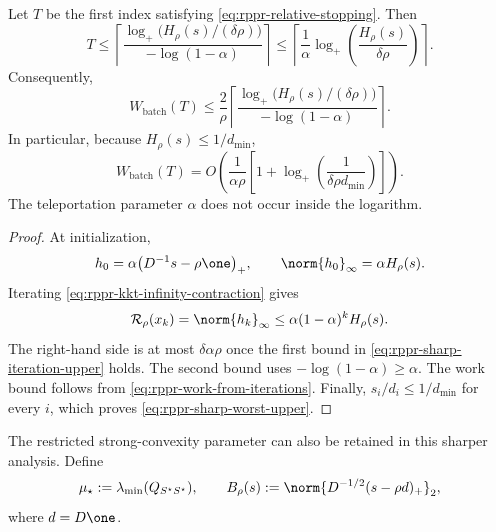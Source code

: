 \begin{theorem}
\label{thm:rppr-sharp-batch-upper}
Let \(T\) be the first index satisfying
\cref{eq:rppr-relative-stopping}.  Then
\begin{equation}
    T
    \leq
    \left\lceil
        \frac{
            \log_+\bigl(H_\rho(s)/(\delta\rho)\bigr)
        }{-\log(1-\alpha)}
    \right\rceil
    \leq
    \left\lceil
        \frac1\alpha
        \log_+\left(\frac{H_\rho(s)}{\delta\rho}\right)
    \right\rceil.
    \label{eq:rppr-sharp-iteration-upper}
\end{equation}
Consequently,
\begin{equation}
    W_{\mathrm{batch}}(T)
    \leq
    \frac{2}{\rho}
    \left\lceil
        \frac{
            \log_+\bigl(H_\rho(s)/(\delta\rho)\bigr)
        }{-\log(1-\alpha)}
    \right\rceil.
    \label{eq:rppr-sharp-work-upper}
\end{equation}
In particular, because \(H_\rho(s)\leq1/d_{\min}\),
\begin{equation}
    W_{\mathrm{batch}}(T)
    =
    O\left(
        \frac{1}{\alpha\rho}
        \left[1+\log_+\left(
            \frac{1}{\delta\rho d_{\min}}
        \right)\right]
    \right).
    \label{eq:rppr-sharp-worst-upper}
\end{equation}
The teleportation parameter \(\alpha\) does not occur inside the logarithm.
\end{theorem}

\begin{proof}
At initialization,
\begin{equation}
    h_0
    =
    \alpha\bigl(D^{-1}s-\rho\one\bigr)_+,
    \qquad
    \norm{h_0}_\infty=\alpha H_\rho(s).
    \label{eq:rppr-initial-excess}
\end{equation}
Iterating \cref{eq:rppr-kkt-infinity-contraction} gives
\[
    \mathcal{R}_\rho(x_k)
    =\norm{h_k}_\infty
    \leq
    \alpha(1-\alpha)^kH_\rho(s).
\]
The right-hand side is at most \(\delta\alpha\rho\) once the first bound in
\cref{eq:rppr-sharp-iteration-upper} holds.  The second bound uses
\(-\log(1-\alpha)\geq\alpha\).  The work bound follows from
\cref{eq:rppr-work-from-iterations}.  Finally,
\(s_i/d_i\leq1/d_{\min}\) for every \(i\), which proves
\cref{eq:rppr-sharp-worst-upper}.
\end{proof}

The restricted strong-convexity parameter can also be retained in this
sharper analysis.  Define
\begin{equation}
    \mu_\star:=\lambda_{\min}(Q_{S^\star S^\star}),
    \qquad
    B_\rho(s)
    :=
    \norm{D^{-1/2}(s-\rho d)_+}_2,
    \label{eq:rppr-restricted-parameters}
\end{equation}
where \(d=D\one\).

